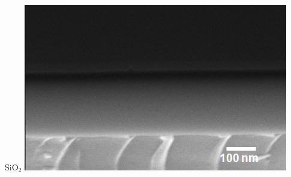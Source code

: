 \documentclass[noamsthm,8pt,t]{beamer}
\begin{document}
\begin{frame}
\begin{columns}
\begin{column}{0.4\textwidth}
\begin{center}
            \vspace{0.3cm}
            SiO$_2$
            \includegraphics[width=\linewidth]{figures/SEM-Xsection-SiO2.png}
         \end{center}
      \end{column}
   \end{columns}
\end{frame}
\end{document}
